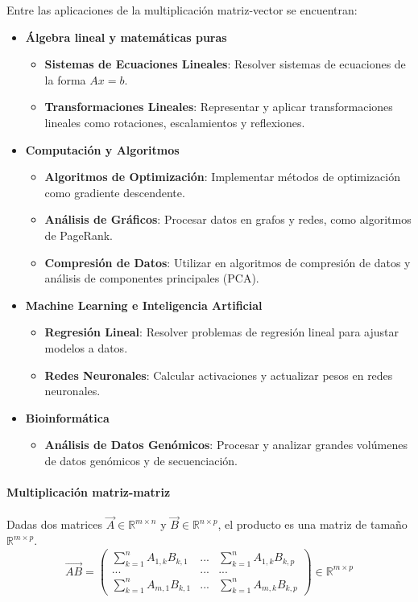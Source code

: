 Entre las aplicaciones de la multiplicación matriz-vector se encuentran:
\begin{itemize}
\item \textbf{Álgebra lineal y matemáticas puras}
\begin{itemize}
\item \textbf{Sistemas de Ecuaciones Lineales}: Resolver sistemas de ecuaciones de la forma $Ax = b$.
\item \textbf{Transformaciones Lineales}: Representar y aplicar transformaciones lineales como rotaciones, escalamientos y reflexiones.
\end{itemize}
\item \textbf{Computación y Algoritmos}
\begin{itemize}
\item \textbf{Algoritmos de Optimización}: Implementar métodos de optimización como gradiente descendente.
\item \textbf{Análisis de Gráficos}: Procesar datos en grafos y redes, como algoritmos de PageRank.
\item \textbf{Compresión de Datos}: Utilizar en algoritmos de compresión de datos y análisis de componentes principales (PCA).
\end{itemize}
\item \textbf{Machine Learning e Inteligencia Artificial}
\begin{itemize}
\item \textbf{Regresión Lineal}: Resolver problemas de regresión lineal para ajustar modelos a datos.
\item \textbf{Redes Neuronales}: Calcular activaciones y actualizar pesos en redes neuronales.
\end{itemize}
\item \textbf{Bioinformática}
\begin{itemize}
\item \textbf{Análisis de Datos Genómicos}: Procesar y analizar grandes volúmenes de datos genómicos y de secuenciación.
\end{itemize}
\end{itemize}

\paragraph{Multiplicación matriz-matriz} Dadas dos matrices $\vec{A} \in \mathbb{R}^{m \times n}$ y $\vec{B} \in \mathbb{R}^{n \times p}$, el producto es una matriz de tamaño $\mathbb{R}^{m \times p}$.
$$\vec{AB} = \begin{pmatrix}
\sum^n_{k=1}A_{1,k}B_{k,1} & ... & \sum^n_{k=1}A_{1,k}B_{k,p} \\
... & ... & ...\\
\sum^n_{k=1}A_{m,1}B_{k,1} & ... & \sum^n_{k=1}A_{m,k}B_{k,p}
\end{pmatrix} \in \mathbb{R}^{m \times p}$$

